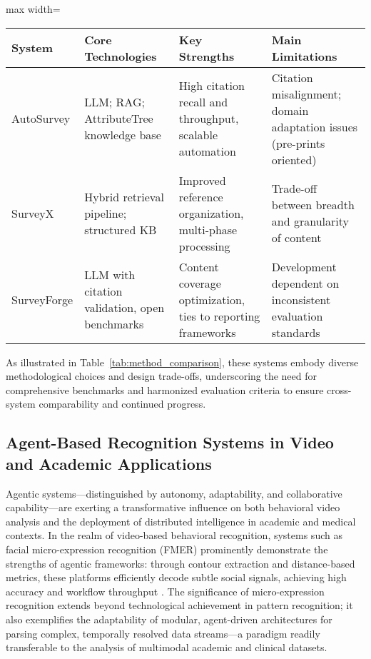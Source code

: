 \documentclass[sigconf]{acmart}
\begin{document}
\begin{table*}[htbp]
\centering
\caption{Comparison of Leading AI-Driven Survey Automation Systems}
\label{tab:method_comparison}
\begin{adjustbox}{max width=\textwidth}
\begin{tabular}{@{}llll@{}}
\toprule
System & Core Technologies & Key Strengths & Main Limitations \\
\midrule
AutoSurvey & LLM; RAG; AttributeTree knowledge base & High citation recall and throughput, scalable automation & Citation misalignment; domain adaptation issues (pre-prints oriented) \\
SurveyX    & Hybrid retrieval pipeline; structured KB & Improved reference organization, multi-phase processing & Trade-off between breadth and granularity of content \\
SurveyForge & LLM with citation validation, open benchmarks & Content coverage optimization, ties to reporting frameworks & Development dependent on inconsistent evaluation standards \\
\bottomrule
\end{tabular}
\end{adjustbox}
\end{table*}

As illustrated in Table~\ref{tab:method_comparison}, these systems embody diverse methodological choices and design trade-offs, underscoring the need for comprehensive benchmarks and harmonized evaluation criteria to ensure cross-system comparability and continued progress.

\subsection{Agent-Based Recognition Systems in Video and Academic Applications}

Agentic systems—distinguished by autonomy, adaptability, and collaborative capability—are exerting a transformative influence on both behavioral video analysis and the deployment of distributed intelligence in academic and medical contexts. In the realm of video-based behavioral recognition, systems such as facial micro-expression recognition (FMER) prominently demonstrate the strengths of agentic frameworks: through contour extraction and distance-based metrics, these platforms efficiently decode subtle social signals, achieving high accuracy and workflow throughput \cite{ref116}. The significance of micro-expression recognition extends beyond technological achievement in pattern recognition; it also exemplifies the adaptability of modular, agent-driven architectures for parsing complex, temporally resolved data streams—a paradigm readily transferable to the analysis of multimodal academic and clinical datasets.
\end{document}

